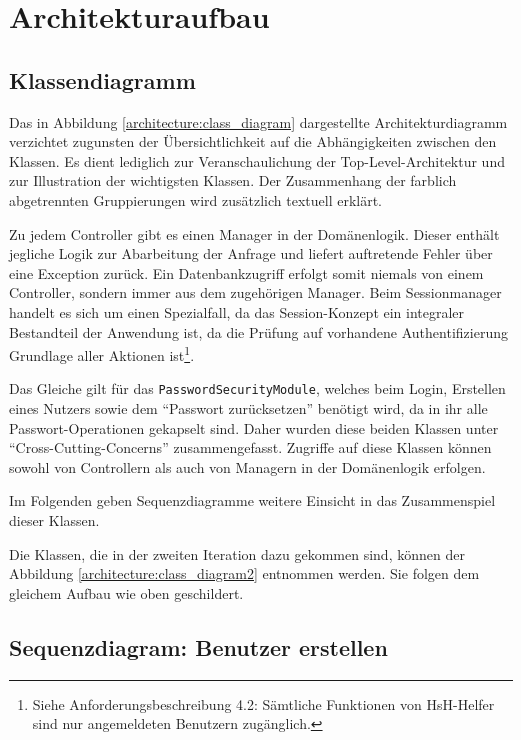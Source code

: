 \documentclass[12pt,DIV14,BCOR10mm,a4paper,parskip=half-,headsepline,headinclude,english,ngerman,bibliography=totocnumbered]{scrreprt}
\begin{document}
\vspace*{-3cm}

\tableofcontents  %

\chapter{Architekturaufbau}
\section{Klassendiagramm}

Das in Abbildung \ref{architecture:class_diagram} dargestellte Architekturdiagramm verzichtet zugunsten der Über\-sichtlichkeit auf die Abhängig\-keiten zwischen den Klassen. Es dient lediglich zur Veranschaulichung der Top-Level-Architektur und zur Illustration der wichtigsten Klassen. Der Zusammenhang der farblich abgetrennten Gruppierungen wird zusätzlich textuell erklärt.

Zu jedem Controller gibt es einen Manager in der Domänenlogik.
Dieser enthält jegliche Logik zur Abarbeitung der Anfrage und liefert auftretende Fehler über eine Exception zurück. Ein Datenbankzugriff erfolgt somit niemals von einem Controller, sondern immer aus dem zugehörigen Manager.
Beim Sessionmanager handelt es sich um einen Spezialfall, da das Session-Konzept ein integraler Bestandteil der Anwendung ist, da die Prüfung auf vorhandene Authentifizierung Grundlage aller Aktionen ist\footnote{Siehe Anforderungsbeschreibung 4.2: Sämtliche Funktionen von HsH-Helfer sind nur angemeldeten Benutzern zugänglich.}.

Das Gleiche gilt für das \texttt{PasswordSecurityModule}, welches beim Login, Erstellen eines Nutzers sowie dem \enquote{Passwort zurücksetzen} benötigt wird, da in ihr alle Passwort-Operationen gekapselt sind.
Daher wurden diese beiden Klassen unter \enquote{Cross-Cutting-Concerns} zusammengefasst.
Zugriffe auf diese Klassen können sowohl von Controllern als auch von Managern in der Domänenlogik erfolgen. \par
Im Folgenden geben Sequenzdiagramme weitere Einsicht in das Zusammenspiel dieser Klassen.

Die Klassen, die in der zweiten Iteration dazu gekommen sind, können der Abbildung \ref{architecture:class_diagram2} entnommen werden.
Sie folgen dem gleichem Aufbau wie oben geschildert.

\section{Sequenzdiagram: Benutzer erstellen}
\end{document}
